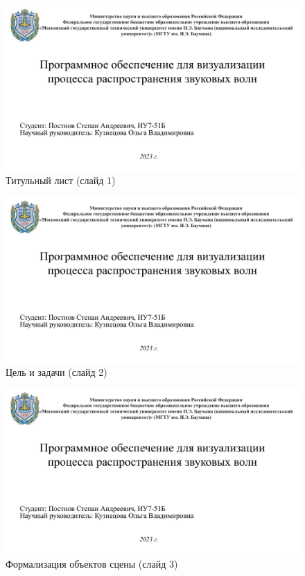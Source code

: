 \begin{appendices}
	\chapter{}
\end{appendices}

\begin{figure}[h]
\centering
\includegraphics[height=0.4\textheight, page=1, angle=90]{inc/img/pres.pdf}
\caption{Титульный лист (слайд 1)}
\end{figure}
\begin{figure}[h]
\centering
\includegraphics[height=0.5\textheight, page=2, angle=90]{inc/img/pres.pdf}
\caption{Цель и задачи (слайд 2)}
\end{figure}
\begin{figure}[h]
\centering
\includegraphics[height=0.5\textheight, page=3, angle=90]{inc/img/pres.pdf}
\caption{Формализация объектов сцены (слайд 3)}
\end{figure}
